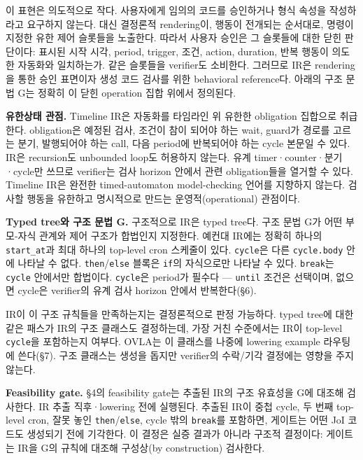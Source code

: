 \documentclass[sigconf,nonacm,anonymous,review]{acmart}
\begin{document}
이 표현은 의도적으로 작다. 사용자에게 임의의 코드를 승인하거나 형식 속성을 작성하라고 요구하지 않는다. 대신 결정론적 rendering이, 행동이 전개되는 순서대로, 명령이 지정한 유한 제어 슬롯들을 노출한다. 따라서 사용자 승인은 그 슬롯들에 대한 닫힌 판단이다: 표시된 시작 시각, period, trigger, 조건, action, duration, 반복 행동이 의도한 자동화와 일치하는가. 같은 슬롯들을 verifier도 소비한다. 그러므로 IR은 rendering을 통한 승인 표면이자 생성 코드 검사를 위한 behavioral reference다. 아래의 구조 문법 G는 정확히 이 닫힌 operation 집합 위에서 정의된다.

\textbf{유한상태 관점.} Timeline IR은 자동화를 타임라인 위 유한한 obligation 집합으로 취급한다. obligation은 예정된 검사, 조건이 참이 되어야 하는 wait, guard가 경로를 고르는 분기, 발행되어야 하는 call, 다음 period에 반복되어야 하는 cycle 본문일 수 있다. IR은 recursion도 unbounded loop도 허용하지 않는다. 유계 timer·counter·분기·cycle만 쓰므로 verifier는 검사 horizon 안에서 관련 obligation들을 열거할 수 있다. Timeline IR은 완전한 timed-automaton model-checking 언어를 지향하지 않는다. 검사할 행동을 유한하고 명시적으로 만드는 운영적(operational) 관점이다.

\textbf{Typed tree와 구조 문법 G.} 구조적으로 IR은 typed tree다. 구조 문법 G가 어떤 부모-자식 관계와 제어 구조가 합법인지 지정한다. 예컨대 IR에는 정확히 하나의 \texttt{start\_at}과 최대 하나의 top-level cron 스케줄이 있다. \texttt{cycle}은 다른 \texttt{cycle.body} 안에 나타날 수 없다. \texttt{then}/\texttt{else} 블록은 \texttt{if}의 자식으로만 나타날 수 있다. \texttt{break}는 \texttt{cycle} 안에서만 합법이다. \texttt{cycle}은 period가 필수다 — \texttt{until} 조건은 선택이며, 없으면 cycle은 verifier의 유계 검사 horizon 안에서 반복한다(\S6).

IR이 이 구조 규칙들을 만족하는지는 결정론적으로 판정 가능하다. typed tree에 대한 같은 패스가 IR의 구조 클래스도 결정하는데, 가장 거친 수준에서는 IR이 top-level \texttt{cycle}을 포함하는지 여부다. OVLA는 이 클래스를 나중에 lowering example 라우팅에 쓴다(\S7). 구조 클래스는 생성을 돕지만 verifier의 수락/기각 결정에는 영향을 주지 않는다.

\textbf{Feasibility gate.} \S4의 feasibility gate는 추출된 IR의 구조 유효성을 G에 대조해 검사한다. IR 추출 직후·lowering 전에 실행된다. 추출된 IR이 중첩 cycle, 두 번째 top-level cron, 잘못 놓인 \texttt{then}/\texttt{else}, cycle 밖의 \texttt{break}를 포함하면, 게이트는 어떤 JoI 코드도 생성되기 전에 기각한다. 이 결정은 실증 결과가 아니라 구조적 결정이다: 게이트는 IR을 G의 규칙에 대조해 구성상(by construction) 검사한다.
\end{document}
